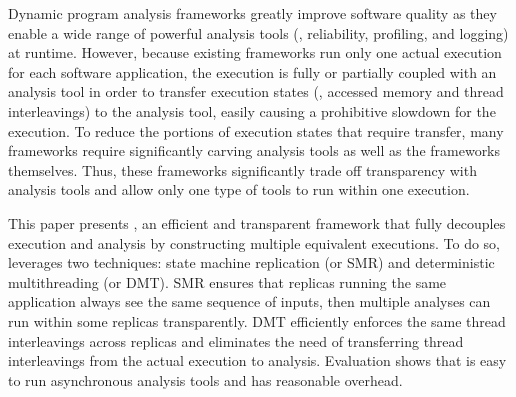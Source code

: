 
Dynamic program analysis frameworks greatly improve software quality as
they enable a wide range of powerful analysis tools (\eg, reliability,
profiling, and logging) at runtime. However, because existing frameworks run
only one actual execution for each software application, the execution is fully
or partially coupled with an analysis tool in order to transfer execution states
(\eg, accessed memory and thread interleavings) to the analysis tool, easily
causing a prohibitive slowdown for the execution. To reduce the portions of
execution states that require transfer, many frameworks require significantly
carving analysis tools as well as the frameworks themselves. Thus, these
frameworks significantly trade off transparency with analysis tools and allow
only one type of tools to run within one execution.


This paper presents \xxx, an efficient and transparent framework that fully 
decouples execution and analysis by constructing multiple equivalent 
executions. To do so, \xxx leverages two techniques: state machine replication 
(or SMR) and deterministic multithreading (or DMT). SMR ensures that replicas 
running the same application always see the same sequence of inputs, then 
multiple analyses can run within some replicas transparently. DMT efficiently
enforces the same thread interleavings across replicas and eliminates the need
of transferring thread interleavings from the actual execution to analysis.
Evaluation shows that \xxx is easy to run asynchronous analysis tools and has
reasonable overhead.
